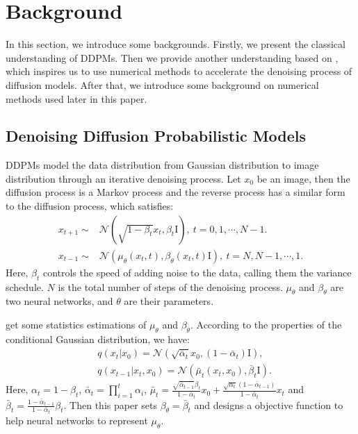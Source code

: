 \documentclass{article}
\begin{document}
\section{Background}
\label{background}

In this section, we introduce some backgrounds. Firstly, we present the classical understanding of DDPMs. Then we provide another understanding based on \citet{Song2020}, which inspires us to use numerical methods to accelerate the denoising process of diffusion models. After that, we introduce some background on numerical methods used later in this paper.

\subsection{Denoising Diffusion Probabilistic Models}

DDPMs model the data distribution from Gaussian distribution to image distribution through an iterative denoising process. Let $x_0$ be an image, then the diffusion process is a Markov process and the reverse process has a similar form to the diffusion process, which satisfies:
\begin{equation}
   \begin{split}
      x_{t+1} \sim &\mathcal{N}(\sqrt{1-\beta_t}x_t, \beta_t \text{I}),\ t=0, 1, \cdots, N-1. \\
      x_{t-1} \sim &\mathcal{N}(\mu_\theta(x_t, t), \beta_\theta(x_t, t) \text{I}),\ t= N, N-1, \cdots, 1.
   \end{split}
\end{equation}
Here, $\beta_t$ controls the speed of adding noise to the data, calling them the variance schedule. $N$ is the total number of steps of the denoising process. $\mu_\theta$ and $\beta_\theta$ are two neural networks, and $\theta$ are their parameters.


\citet{Ho2020} get some statistics estimations of $\mu_\theta$ and $\beta_\theta$. According to the properties of the conditional Gaussian distribution, we have:
\begin{equation}
   \begin{split}
      &q(x_t|x_0) = \mathcal{N}(\sqrt{\bar{\alpha}_t}x_0, (1-\bar{\alpha}_t) \text{I}), \\
      &q(x_{t-1}| x_t, x_0) = \mathcal{N}(\bar{\mu}_t(x_t, x_0), \bar{\beta}_t \text{I}).
   \end{split}
   \label{qt}
\end{equation}
Here, $\alpha_t=1-\beta_t$, $\bar{\alpha}_t = \prod_{i=1}^t\alpha_i$, $\bar{\mu}_t = \frac{\sqrt{\bar{\alpha}_{t-1}}\beta_t}{1-\bar{\alpha}_t}x_0 + \frac{\sqrt{\alpha_t}(1-\bar{\alpha}_{t-1})}{1-\bar{\alpha}_t}x_t$ and $\bar{\beta}_t=\frac{1-\bar{\alpha}_{t-1}}{1-\bar{\alpha}_t}\beta_t$.  Then this paper sets $\beta_\theta = \bar{\beta}_t$ and designs a objective function to help neural networks to represent $\mu_\theta$.
\end{document}

